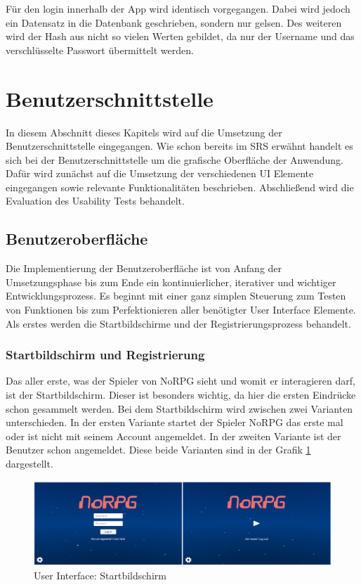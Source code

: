			Für den login innerhalb der App wird identisch vorgegangen. Dabei wird jedoch ein Datensatz in die Datenbank geschrieben, sondern nur gelsen. Des weiteren wird der Hash aus nicht so vielen Werten gebildet, da nur der Username und das verschlüsselte Passwort übermittelt werden.

	\section{Benutzerschnittstelle}
		In diesem Abschnitt dieses Kapitels wird auf die Umsetzung der Benutzerschnittstelle eingegangen. Wie schon bereits im \ac{SRS} erwähnt handelt es sich bei der Benutzerschnittstelle um die grafische Oberfläche der Anwendung. Dafür wird zunächst auf die Umsetzung der verschiedenen \ac{UI} Elemente eingegangen sowie relevante Funktionalitäten beschrieben. Abschließend wird die Evaluation des Usability Tests behandelt. 

		\subsection{Benutzeroberfläche}	
			Die Implementierung der Benutzeroberfläche ist von Anfang der Umsetzungsphase bis zum Ende ein kontinuierlicher, iterativer und wichtiger Entwicklungsprozess. Es beginnt mit einer ganz simplen Steuerung zum Testen von Funktionen bis zum Perfektionieren aller benötigter User Interface Elemente. Als erstes werden die Startbildschirme und der Registrierungsprozess behandelt. 

			\subsubsection{Startbildschirm und Registrierung}
				Das aller erste, was der Spieler von NoRPG sieht und womit er interagieren darf, ist der Startbildschirm. Dieser ist besonders wichtig, da hier die ersten Eindrücke schon gesammelt werden. Bei dem Startbildschirm wird zwischen zwei Varianten unterschieden. In der ersten Variante startet der Spieler NoRPG das erste mal oder ist nicht mit seinem Account angemeldet. In der zweiten Variante ist der Benutzer schon angemeldet. Diese beide Varianten sind in der Grafik \ref{startScreenUI} dargestellt.

				\begin{figure}[htbp]
					\centering 
					\label{startScreenUI}
					\includegraphics[width=\textwidth]{pics/startbildschirmeScreen.png}
					\caption{User Interface: Startbildschirm}
				\end{figure}

